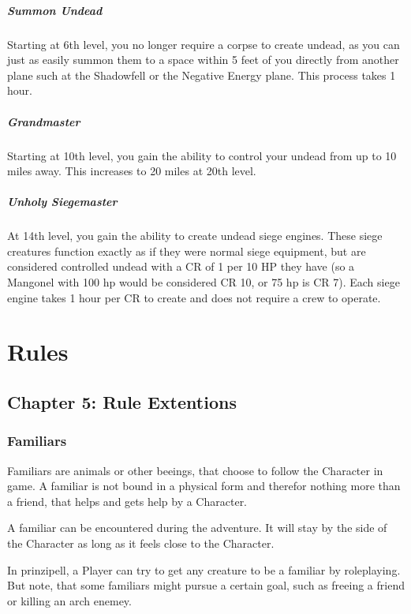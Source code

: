 \documentclass[10pt,twoside,twocolumn,openany]{book}
\begin{document}
\subsubsection{Summon Undead}
Starting at 6th level, you no longer require a corpse to create undead, as you can just as easily summon them to a space within 5 feet of you directly from another plane such at the Shadowfell or the Negative Energy plane. This process takes 1 hour.

\subsubsection{Grandmaster}
Starting at 10th level, you gain the ability to control your undead from up to 10 miles away. This increases to 20 miles at 20th level.

\subsubsection{Unholy Siegemaster}
At 14th level, you gain the ability to create undead siege engines. These siege creatures function exactly as if they were normal siege equipment, but are considered controlled undead with a CR of 1 per 10 HP they have (so a Mangonel with 100 hp would be considered CR 10, or 75 hp is CR 7). Each siege engine takes 1 hour per CR to create and does not require a crew to operate.

\part{Rules}
\chapter{Chapter 5: Rule Extentions}
\section{Familiars}

Familiars are animals or other beeings, that choose to follow the Character in game. A familiar is not bound in a physical form and therefor nothing more than a friend, that helps and gets help by a Character.

A familiar can be encountered during the adventure. It will stay by the side of the Character as long as it feels close to the Character.

In prinzipell, a Player can try to get any creature to be a familiar by roleplaying. But note, that some familiars might pursue a certain goal, such as freeing a friend or killing an arch enemey.
\end{document}
